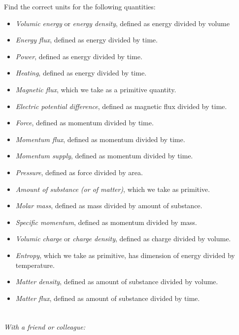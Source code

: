 \documentclass[a4paper,12pt,%
onecolumn,oneside,%
british%
]{memoir}
\renewcommand*{\|}[1][]{\nonscript\:#1\vert\nonscript\:\mathopen{}}
\begin{document}
Find the correct units for the following quantities:
\begin{itemize}[noitemsep]
\item \emph{Volumic energy} or \emph{energy density}, defined as energy divided by volume
\item \emph{Energy flux}, defined as energy divided by time.
\item \emph{Power}, defined as energy divided by time.
\item \emph{Heating}, defined as energy divided by time.
\item \emph{Magnetic flux}, which we take as a primitive quantity.
\item \emph{Electric potential difference}, defined as magnetic flux divided by time.
\item \emph{Force}, defined as momentum divided by time.
\item \emph{Momentum flux}, defined as momentum divided by time.
\item \emph{Momentum supply}, defined as momentum divided by time.
\item \emph{Pressure}, defined as force divided by area.
\item \emph{Amount of substance (or of matter)}, which we take as primitive.
\item \emph{Molar mass}, defined as mass divided by amount of substance.
\item \emph{Specific momentum}, defined as momentum divided by mass.
\item \emph{Volumic charge} or \emph{charge density}, defined as charge divided by volume.
\item \emph{Entropy}, which we take as primitive, has dimension of energy divided by temperature.
\item \emph{Matter density}, defined as amount of substance divided by volume.
\item \emph{Matter flux}, defined as amount of substance divided by time.
\end{itemize}

\section{}\label{sec:explain_primitive}

\emph{With a friend or colleague:}

\smallskip
\end{document}
